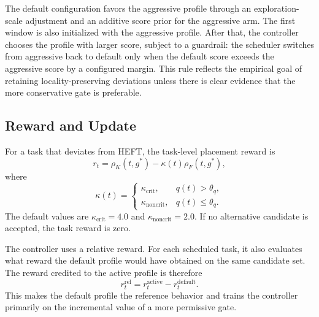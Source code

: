 The default configuration favors the aggressive profile through an exploration-scale adjustment and an additive score prior for the aggressive arm. The first window is also initialized with the aggressive profile. After that, the controller chooses the profile with larger score, subject to a guardrail: the scheduler switches from aggressive back to default only when the default score exceeds the aggressive score by a configured margin. This rule reflects the empirical goal of retaining locality-preserving deviations unless there is clear evidence that the more conservative gate is preferable.

\subsection{Reward and Update}
\label{subsec:methods-bandit-reward}

For a task that deviates from HEFT, the task-level placement reward is
\begin{equation}
r_t
=
\rho_K(t,g^{*})
-
\kappa(t)\rho_F(t,g^{*}),
\end{equation}
where
\begin{equation}
\kappa(t)=
\left\{
\begin{array}{ll}
\kappa_{\mathrm{crit}}, & q(t)>\theta_q,\\
\kappa_{\mathrm{noncrit}}, & q(t)\leq\theta_q.
\end{array}
\right.
\end{equation}
The default values are $\kappa_{\mathrm{crit}}=4.0$ and $\kappa_{\mathrm{noncrit}}=2.0$. If no alternative candidate is accepted, the task reward is zero.

The controller uses a relative reward. For each scheduled task, it also evaluates what reward the default profile would have obtained on the same candidate set. The reward credited to the active profile is therefore
\begin{equation}
r_t^{\mathrm{rel}}
=
r_t^{\mathrm{active}}-r_t^{\mathrm{default}}.
\end{equation}
This makes the default profile the reference behavior and trains the controller primarily on the incremental value of a more permissive gate.

